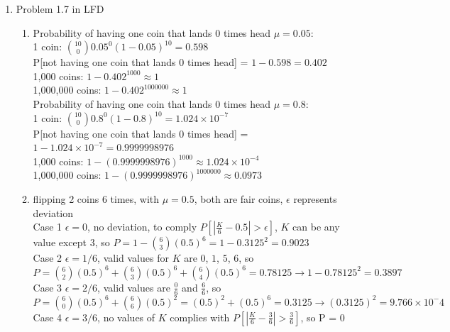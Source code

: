 \documentclass{article}
\begin{document}
\begin{enumerate}
        \item Problem 1.7 in LFD
        \begin{enumerate}[label=(\alph*)]
            \item Probability of having one coin that lands 0 times head $\mu = 0.05$:\\
            1 coin: ${10 \choose 0}0.05^0(1-0.05)^{10} = 0.598$\\
            P[not having one coin that lands 0 times head] = $1 - 0.598 = 0.402$\\
            1,000 coins: $1 - 0.402^{1000} \approx 1$\\
            1,000,000 coins: $1 - 0.402^{1000000} \approx 1$\\[0.25in]
            Probability of having one coin that lands 0 times head $\mu = 0.8$:\\
            1 coin: ${10 \choose 0}0.8^0(1-0.8)^{10} = 1.024 \times 10^{-7}$\\
            P[not having one coin that lands 0 times head] = $1 - 1.024 \times 10^{-7} = 0.9999998976$\\
            1,000 coins: $1 - (0.9999998976)^{1000} \approx 1.024 \times 10^{-4}$\\
            1,000,000 coins: $1 - (0.9999998976)^{1000000} \approx 0.0973$
            \item flipping 2 coins 6 times, with $\mu = 0.5$, both are fair coins, $\epsilon$ represents deviation\\
            Case 1 $\epsilon = 0$, no deviation, to comply $P[ | \frac{K}{6} - 0.5 | > \epsilon]$, $K$ can be any value except 3, so $P = 1-{6\choose 3}(0.5)^6 = 1-0.3125^2=0.9023$\\[0.25in]
            Case 2 $\epsilon = 1/6$, valid values for $K$ are $0$, $1$, $5$, $6$, so $P = {6 \choose 2}(0.5)^6 + {6 \choose 3}(0.5)^6 + {6 \choose 4}(0.5)^6 = 0.78125 \rightarrow 1 - 0.78125^2 = 0.3897$\\[0.25in]
            Case 3 $\epsilon = 2/6$, valid values are $\frac{0}{6}$ and $\frac{6}{6}$, so $P = {6 \choose 0}(0.5)^6 + {6 \choose 6}(0.5)^2 = (0.5)^2 + (0.5)^6 = 0.3125 \rightarrow (0.3125)^2 = 9.766 \times 10^-4$\\[0.25in]
            Case 4 $\epsilon = 3/6$, no values of $K$ complies with $P[|\frac{K}{6} - \frac{3}{6}| > \frac{3}{6}]$, so P = 0
            \begin{center}

\end{center}
\end{enumerate}
\end{enumerate}
\end{document}
